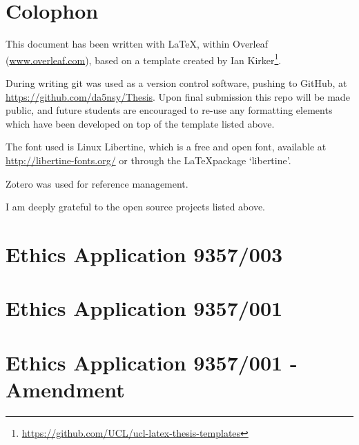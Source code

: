 {}

\appendix

\chapter{Colophon}
\label{app:Colophon}

This document has been written with \LaTeX, within Overleaf (\url{www.overleaf.com}), based on a template created by Ian Kirker\footnote{\url{https://github.com/UCL/ucl-latex-thesis-templates}}. 

During writing git was used as a version control software, pushing to GitHub, at \url{https://github.com/da5nsy/Thesis}. Upon final submission this repo will be made public, and future students are encouraged to re-use any formatting elements which have been developed on top of the template listed above.

The font used is Linux Libertine, which is a free and open font, available at \url{http://libertine-fonts.org/} or through the \LaTeX package `libertine'.

Zotero was used for reference management.

I am deeply grateful to the open source projects listed above.

\chapter{Ethics Application 9357/003}
\label{app:ethics3}


\chapter{Ethics Application 9357/001}
\label{app:ethics1}


\chapter{Ethics Application 9357/001 - Amendment}
\label{app:ethics2}


